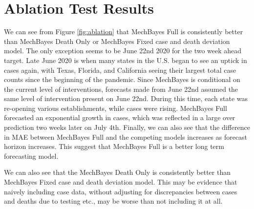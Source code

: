 \documentclass{umassthesis}          %
\begin{document}
   \section{Ablation Test Results}

We can see from Figure \ref{fig:ablation} that MechBayes Full is consistently better than MechBayes Death Only or MechBayes Fixed case and death deviation model. The only exception seems to be June 22nd 2020 for the two week ahead target. Late June 2020 is when many states in the U.S. began to see an uptick in cases again, with Texas, Florida, and California seeing their largest total case counts since the beginning of the pandemic. Since MechBayes is conditional on the current level of interventions, forecasts made from June 22nd assumed the same level of intervention present on June 22nd. During this time, each state was re-opening various establishments, while cases were rising. MechBayes Full forecasted an exponential growth in cases, which was reflected in a large over prediction two weeks later on July 4th. Finally, we can also see that the difference in MAE between MechBayes Full and the competing models increases as forecast horizon increases. This suggest that MechBayes Full is a better long term forecasting model.

We can also see that the MechBayes Death Only is consistently better than MechBayes Fixed case and death deviation model.  This may be evidence that naively including case data, without adjusting for discrepancies between cases and deaths due to testing etc., may be worse than not including it at all. 
\end{document}
